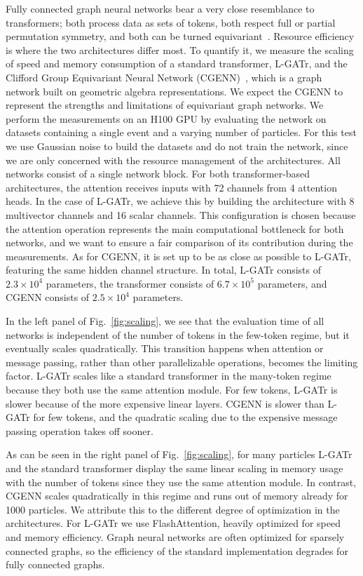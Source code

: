 \documentclass[submission, Phys]{SciPost}
\begin{document}
Fully connected graph neural networks bear a very close resemblance to transformers; both process data as sets of tokens, both respect full or partial permutation symmetry, and both can be turned equivariant~\cite{Gong:2022lye, Bogatskiy:2022czk, ruhe2023clifford,Spinner:2024hjm}. Resource efficiency is where the two architectures differ most. To quantify it, we measure the scaling of speed and memory consumption of a standard transformer, L-GATr, and the Clifford Group Equivariant Neural Network (CGENN)~\cite{ruhe2023clifford}, which is a graph network built on geometric algebra representations. We expect the CGENN to represent the strengths and limitations of equivariant graph networks. We perform the measurements on an H100 GPU by evaluating the network on datasets containing a single event and a varying number of particles. For this test we use Gaussian noise to build the datasets and do not train the network, since we are only concerned with the resource management of the architectures.  All networks consist of a single network block. For both transformer-based architectures, the attention receives inputs with 72 channels from 4 attention heads. In the case of L-GATr, we achieve this by building the architecture with 8 multivector channels and 16 scalar channels. This configuration is chosen because the attention operation represents the main computational bottleneck for both networks, and we want to ensure a fair comparison of its contribution during the measurements. As for CGENN, it is set up to be as close as possible to L-GATr, featuring the same hidden channel structure. In total, L-GATr consists of $2.3 \times 10^4$ parameters, the transformer consists of $6.7 \times 10^5$ parameters, and CGENN consists of $2.5 \times 10^4$ parameters.

In the left panel of Fig.~\ref{fig:scaling}, we see that the evaluation time of all networks is independent of the number of tokens in the few-token regime, but it eventually scales quadratically. This transition happens when attention or message passing, rather than other parallelizable operations, becomes the limiting factor. L-GATr scales like a standard transformer in the many-token regime because they both use the same attention module. For few tokens, L-GATr is slower because of the more expensive linear layers. CGENN is slower than L-GATr for few tokens, and the quadratic scaling due to the expensive message passing operation takes off sooner.

As can be seen in the right panel of Fig.~\ref{fig:scaling}, for many particles L-GATr and the standard transformer display the same linear scaling in memory usage with the number of tokens since they use the same attention module. In contrast, CGENN scales quadratically in this regime and runs out of memory already for 1000 particles. We attribute this to the different degree of optimization in the architectures. For L-GATr we use FlashAttention, heavily optimized for speed and memory efficiency. Graph neural networks are often optimized for sparsely connected graphs, so the efficiency of the standard implementation degrades for fully connected graphs.
\end{document}

